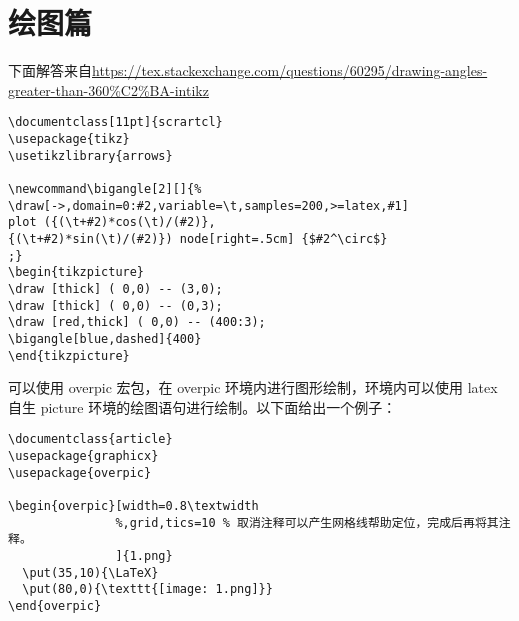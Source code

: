 %
%
%
%

\section{绘图篇}



下面解答来自\url{https://tex.stackexchange.com/questions/60295/drawing-angles-greater-than-360\%C2\%BA-intikz}

\begin{verbatim}
\documentclass[11pt]{scrartcl}
\usepackage{tikz}
\usetikzlibrary{arrows}

\newcommand\bigangle[2][]{%
\draw[->,domain=0:#2,variable=\t,samples=200,>=latex,#1]
plot ({(\t+#2)*cos(\t)/(#2)},
{(\t+#2)*sin(\t)/(#2)}) node[right=.5cm] {$#2^\circ$}
;}
\begin{tikzpicture}
\draw [thick] ( 0,0) -- (3,0);
\draw [thick] ( 0,0) -- (0,3);
\draw [red,thick] ( 0,0) -- (400:3);
\bigangle[blue,dashed]{400}
\end{tikzpicture}

\end{verbatim}






可以使用 overpic 宏包，在 overpic 环境内进行图形绘制，环境内可以使用
latex 自生 picture 环境的绘图语句进行绘制。以下面给出一个例子：

\begin{verbatim}
\documentclass{article}
\usepackage{graphicx}
\usepackage{overpic}

\begin{overpic}[width=0.8\textwidth
               %,grid,tics=10 % 取消注释可以产生网格线帮助定位，完成后再将其注释。
               ]{1.png}
  \put(35,10){\LaTeX}
  \put(80,0){\texttt{[image: 1.png]}}
\end{overpic}

\end{verbatim}

